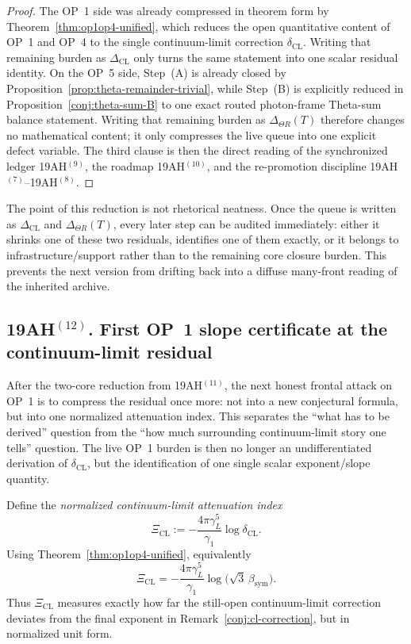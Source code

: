 \begin{proof}
The OP~1 side was already compressed in theorem form by Theorem~\ref{thm:op1op4-unified}, which reduces the open quantitative content of OP~1 and OP~4 to the single continuum-limit correction \(\delta_{\mathrm{CL}}\). Writing that remaining burden as \(\Delta_{\mathrm{CL}}\) only turns the same statement into one scalar residual identity. On the OP~5 side, Step~(A) is already closed by Proposition~\ref{prop:theta-remainder-trivial}, while Step~(B) is explicitly reduced in Proposition~\ref{conj:theta-sum-B} to one exact routed photon-frame Theta-sum balance statement. Writing that remaining burden as \(\Delta_{\Theta R}(T)\) therefore changes no mathematical content; it only compresses the live queue into one explicit defect variable. The third clause is then the direct reading of the synchronized ledger 19AH$^{(9)}$, the roadmap 19AH$^{(10)}$, and the re-promotion discipline 19AH$^{(7)}$--19AH$^{(8)}$.
\end{proof}

\begin{remark}
The point of this reduction is not rhetorical neatness. Once the queue is written as \(\Delta_{\mathrm{CL}}\) and \(\Delta_{\Theta R}(T)\), every later step can be audited immediately: either it shrinks one of these two residuals, identifies one of them exactly, or it belongs to infrastructure/support rather than to the remaining core closure burden. This prevents the next version from drifting back into a diffuse many-front reading of the inherited archive.
\end{remark}


\subsection*{19AH$^{(12)}$. First OP~1 slope certificate at the continuum-limit residual}
After the two-core reduction from 19AH$^{(11)}$, the next honest frontal attack on OP~1 is to compress the residual once more: not into a new conjectural formula, but into one normalized attenuation index. This separates the ``what has to be derived'' question from the ``how much surrounding continuum-limit story one tells'' question. The live OP~1 burden is then no longer an undifferentiated derivation of \(\delta_{\mathrm{CL}}\), but the identification of one single scalar exponent/slope quantity.

\begin{definition}
\label{def:xi-cl}
Define the \emph{normalized continuum-limit attenuation index}
\[
 \Xi_{\mathrm{CL}}
 :=
 -\frac{4\pi\gamma_L^5}{\gamma_1}\log \delta_{\mathrm{CL}}.
\]
Using Theorem~\ref{thm:op1op4-unified}, equivalently
\[
 \Xi_{\mathrm{CL}}
 =
 -\frac{4\pi\gamma_L^5}{\gamma_1}\log\!\bigl(\sqrt{3}\,\beta_{\mathrm{sym}}\bigr).
\]
Thus \(\Xi_{\mathrm{CL}}\) measures exactly how far the still-open continuum-limit correction deviates from the final exponent in Remark~\ref{conj:cl-correction}, but in normalized unit form.
\end{definition}

